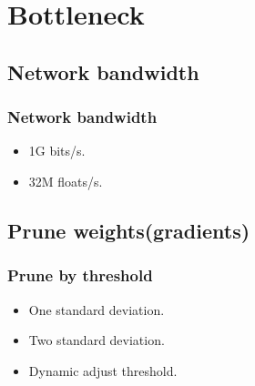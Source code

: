 \section{Bottleneck}

\subsection{Network bandwidth}
\begin{frame}
    \frametitle{Network bandwidth}
	\begin{itemize}
		\item 1G bits/s.
		\item 32M floats/s. 
	\end{itemize}
\end{frame}


\subsection{Prune weights(gradients)}
\begin{frame}
    \frametitle{Prune by threshold}
    \begin{itemize}
		\item One standard deviation.
		\item Two standard deviation. 
		\item Dynamic adjust threshold. 
	\end{itemize}
\end{frame}



